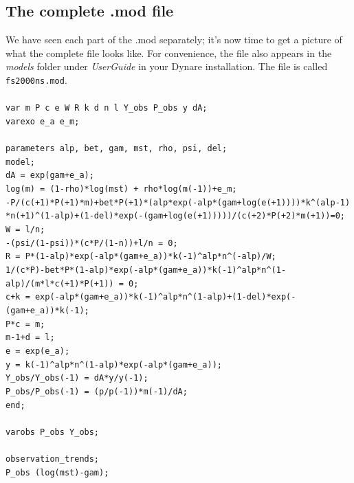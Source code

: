 \subsection{The complete .mod file}
We have seen each part of the .mod separately; it's now time to get a picture of what the complete file looks like. For convenience, the file also appears in the \textsl{models} folder under \textsl{UserGuide} in your Dynare installation. The file is called \texttt{fs2000ns.mod}. \\
\\
\texttt{var m P c e W R k d n l Y\_obs P\_obs y dA; \\
varexo e\_a e\_m;\\
\\
parameters alp, bet, gam, mst, rho, psi, del;
\\
model;\\
dA = exp(gam+e\_a);\\
log(m) = (1-rho)*log(mst) + rho*log(m(-1))+e\_m;\\
-P/(c(+1)*P(+1)*m)+bet*P(+1)*(alp*exp(-alp*(gam+log(e(+1))))*k\textasciicircum (alp-1)\\
*n(+1)\textasciicircum (1-alp)+(1-del)*exp(-(gam+log(e(+1)))))/(c(+2)*P(+2)*m(+1))=0;\\
W = l/n;\\
-(psi/(1-psi))*(c*P/(1-n))+l/n = 0;\\
R = P*(1-alp)*exp(-alp*(gam+e\_a))*k(-1)\textasciicircum alp*n\textasciicircum (-alp)/W;\\
1/(c*P)-bet*P*(1-alp)*exp(-alp*(gam+e\_a))*k(-1)\textasciicircum alp*n\textasciicircum (1-alp)/(m*l*c(+1)*P(+1)) = 0;\\
c+k = exp(-alp*(gam+e\_a))*k(-1)\textasciicircum alp*n\textasciicircum (1-alp)+(1-del)*exp(-(gam+e\_a))*k(-1);\\
P*c = m;\\
m-1+d = l;\\
e = exp(e\_a);\\
y = k(-1)\textasciicircum alp*n\textasciicircum (1-alp)*exp(-alp*(gam+e\_a));\\
Y\_obs/Y\_obs(-1) = dA*y/y(-1);\\
P\_obs/P\_obs(-1) = (p/p(-1))*m(-1)/dA;\\
end;\\
\\
varobs P\_obs Y\_obs;\\
\\
observation\_trends;\\
P\_obs (log(mst)-gam);\\
}
